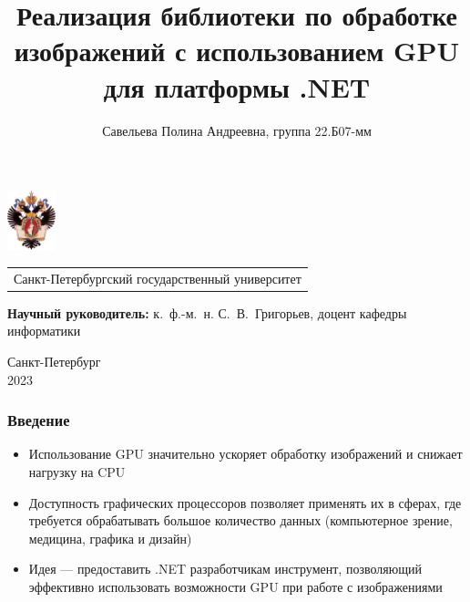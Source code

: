 \documentclass[aspectratio=169]{beamer}
\title[GPU Image Processing]{Реализация библиотеки по обработке изображений с использованием GPU для платформы .NET}
\institute[СПбГУ]{}
\author[Савельева Полина]{Савельева Полина Андреевна, группа 22.Б07-мм}
\begin{document}
{
\begin{frame}
  \includegraphics[width=1.4cm]{pictures/SPbGU_Logo.png}
\vspace{-35pt}
\hspace{-10pt}
\begin{center}
   \begin{tabular}{c}
        \scriptsize{Санкт-Петербургский государственный университет} \\
    \end{tabular}
\titlepage
\end{center}

\btVFill

{\scriptsize
   \textbf{Научный руководитель:} к.~ф.-м.~н. С.~В.~Григорьев, доцент кафедры информатики \\
 }
\begin{center}
  \vspace{5pt}
  \scriptsize{Санкт-Петербург\\
                 2023}
  \end{center}

\end{frame}
}

\begin{frame}[fragile]  
  \frametitle{Введение}
  \begin{itemize}
    \item Использование GPU значительно ускоряет обработку изображений и снижает нагрузку на CPU
    \item Доступность графических процессоров позволяет применять их в сферах, где требуется обрабатывать большое количество данных (компьютерное зрение, медицина, графика и дизайн)
    \item Идея --- предоставить .NET разработчикам инструмент, позволяющий эффективно использовать возможности GPU при работе с изображениями
  \end{itemize}
\end{frame}
            
\end{document}
